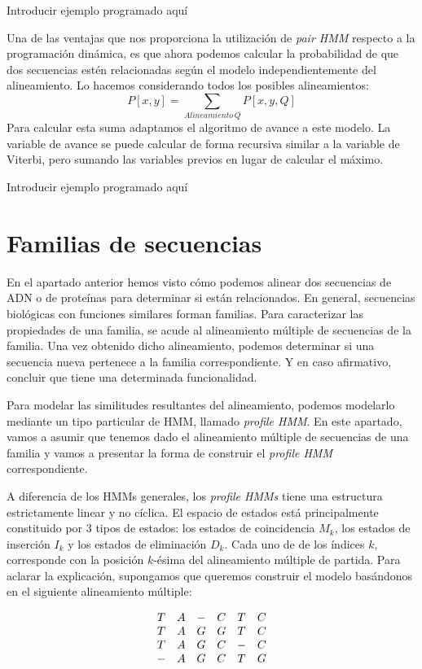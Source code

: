 \begin{exampleth}
    Introducir ejemplo programado aquí
\end{exampleth}

Una de las ventajas que nos proporciona la utilización de \textit{pair HMM} respecto a la programación dinámica, es que ahora podemos calcular la probabilidad de que dos secuencias estén relacionadas según el modelo independientemente del alineamiento. Lo hacemos considerando todos los posibles alineamientos:
\[P[x,y]=\sum_{Alineamiento\, Q}P[x,y,Q]\]
Para calcular esta suma adaptamos el algoritmo de avance a este modelo. La variable de avance se puede calcular de forma recursiva similar a la variable de Viterbi, pero sumando las variables previos en lugar de calcular el máximo.

\begin{exampleth}
    Introducir ejemplo programado aquí
\end{exampleth}

\section{Familias de secuencias}
En el apartado anterior hemos visto cómo podemos alinear dos secuencias de ADN o de proteínas para determinar si están relacionados. En general, secuencias biológicas con funciones similares forman familias. Para caracterizar las propiedades de una familia, se acude al alineamiento múltiple de secuencias de la familia. Una vez obtenido dicho alineamiento, podemos determinar si una secuencia nueva pertenece a la familia correspondiente. Y en caso afirmativo, concluir que tiene una determinada funcionalidad. 

Para modelar las similitudes resultantes del alineamiento, podemos modelarlo mediante un tipo particular de HMM, llamado \textit{profile HMM}. En este apartado, vamos a asumir que tenemos dado el alineamiento múltiple de secuencias de una familia y vamos a presentar la forma de construir el \textit{profile HMM} correspondiente. 

A diferencia de los HMMs generales, los \textit{profile HMMs} tiene una estructura estrictamente linear y no cíclica. El espacio de estados está principalmente constituido por $3$ tipos de estados: los estados de coincidencia $M_k$, los estados de inserción $I_k$ y los estados de eliminación $D_k$. Cada uno de de los índices $k$, corresponde con la posición $k$-ésima del alineamiento múltiple de partida. Para aclarar la explicación, supongamos que queremos construir el modelo basándonos en el siguiente alineamiento múltiple:

\begin{exampleth}
    \[\begin{array}{c c c c c c}
        T & A & - & C & T & C \\
        T & A & G & G & T & C \\
        T & A & G & C & - & C \\
        - & A & G & C & T & G \\
    \end{array}\]    
\end{exampleth}
